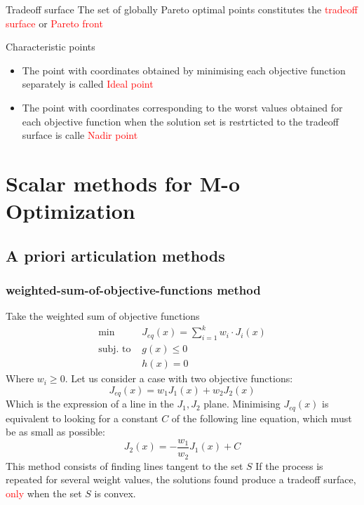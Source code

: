 \documentclass{book}
\begin{document}
\begin{Definition}{Tradeoff surface}{}
    The set of globally Pareto optimal points constitutes the \textcolor{red}{tradeoff surface} or \textcolor{red}{Pareto front}
\end{Definition}
\begin{Definition}{Characteristic points}{}
    \begin{itemize}
        \item The point with coordinates obtained by minimising each objective function separately is called \textcolor{red}{Ideal point} 
        \item The point with coordinates corresponding to the worst values obtained for each objective function when the solution set is restrticted to the tradeoff surface is calle \textcolor{red}{Nadir point}
    \end{itemize}
\end{Definition}
\chapter{Scalar methods for M-o Optimization}
\section{A priori articulation methods}
\subsection{weighted-sum-of-objective-functions method}
Take the weighted sum of objective functions 
\begin{align*}
    \min & J_{eq}(x) = \displaystyle\sum_{i=1}^{k}w_i\cdot J_i(x)\\ 
    \text{subj. to } & g(x)\leq 0 \\ 
    & h(x) = 0
\end{align*}
Where $w_i\geq 0$. Let us consider a case with two objective functions:
\[
    J_{eq}(x) = w_1J_1(x) + w_2J_2(x)
\]
Which is the expression of a line in the $J_1,J_2$ plane.
Minimising $J_{eq}(x)$ is equivalent to looking for a constant $C$ of the following line equation, which must be as small as possible:
\[
    J_2(x) = -\displaystyle\frac{w_1}{w_2}J_1(x)+C
\]
This method consists of finding lines tangent to the set $S$ 
If the process is repeated for several weight values, the solutions found produce a tradeoff surface, \textcolor{red}{only} when the set $S$ is convex.
\end{document}
